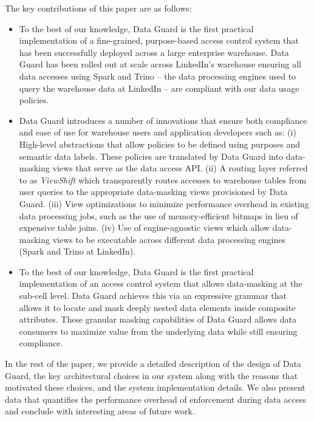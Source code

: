 The key contributions of this paper are as follows:
\begin{itemize}
    \item To the best of our knowledge, Data Guard is the first practical implementation of a fine-grained, purpose-based access control system that has been successfully deployed across a large enterprise warehouse. Data Guard has been rolled out at scale across LinkedIn's warehouse ensuring all data accesses using Spark and Trino -- 
    the data processing engines used to query the warehouse data at LinkedIn -- are compliant with our data usage policies. 
    \item Data Guard introduces a number of innovations that ensure both compliance and ease of use for warehouse users and application developers such as: 
    (i) High-level abstractions that allow policies to be defined using purposes and semantic data labels. These policies are translated by Data Guard into data-masking views that serve as the data access API. 
    (ii) A routing layer referred to as {\em ViewShift} which transparently routes accesses to warehouse tables from user queries to the appropriate data-masking views provisioned by Data Guard. 
    (iii) View optimizations to minimize performance overhead in existing data processing jobs, such as the use of memory-efficient bitmaps in lieu of expensive table joins.  
    (iv) Use of engine-agnostic views which allow data-masking views to be executable across different data processing engines (Spark and Trino at LinkedIn).
    \item To the best of our knowledge, Data Guard is the first practical implementation of an access control system that allows data-masking at the sub-cell level. 
    Data Guard achieves this via an expressive grammar that allows it to locate and mask deeply nested data elements inside composite attributes. 
    These granular masking capabilities of Data Guard allows data consumers to maximize value from the underlying data while still ensuring compliance. 
\end{itemize}  

In the rest of the paper, we provide a detailed description of the design of Data Guard, the key architectural choices in our system along with the reasons that motivated these choices, and the system implementation details. 
We also present data that quantifies the performance overhead of enforcement during data access and conclude with interesting areas of future work.
